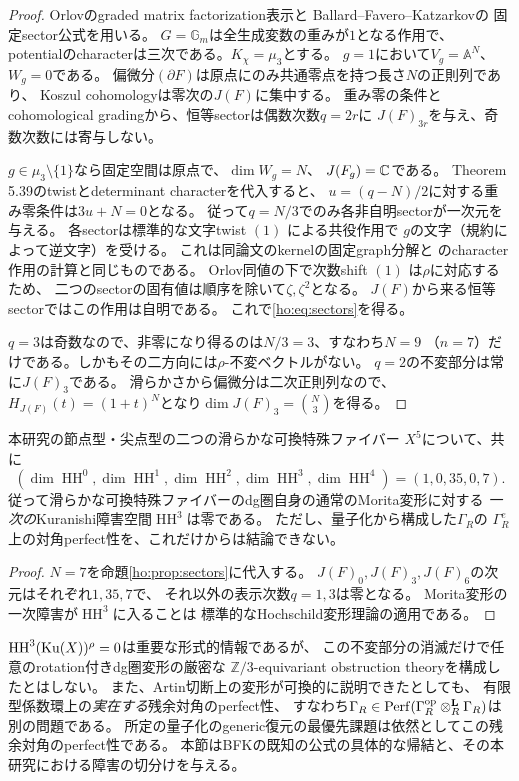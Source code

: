 \begin{proof}
Orlovのgraded matrix factorization表示と
Ballard--Favero--Katzarkov\cite[Theorem 5.39, pp.~82--85]{BFKER}の
固定sector公式を用いる。
$G=\mathbb G_m$は全生成変数の重みが$1$となる作用で、
potentialのcharacterは三次である。$K_\chi=\mu_3$とする。
$g=1$において$V_g=\mathbb A^N$、$W_g=0$である。
偏微分$(\partial F)$は原点にのみ共通零点を持つ長さ$N$の正則列であり、
Koszul cohomologyは零次の$J(F)$に集中する。
重み零の条件とcohomological gradingから、恒等sectorは偶数次数$q=2r$に
$J(F)_{3r}$を与え、奇数次数には寄与しない。

$g\in\mu_3\setminus\{1\}$なら固定空間は原点で、$\dim W_g=N$、
$J(F_g)=\mathbb C$である。
Theorem 5.39のtwistとdeterminant characterを代入すると、
$u=(q-N)/2$に対する重み零条件は$3u+N=0$となる。
従って$q=N/3$でのみ各非自明sectorが一次元を与える。
各sectorは標準的な文字twist $(1)$ による共役作用で
$g$の文字（規約によって逆文字）を受ける。
これは同論文のkernelの固定graph分解と
\cite[Theorem 6.5]{BFKER}のcharacter作用の計算と同じものである。
Orlov同値の下で次数shift $(1)$ は$\rho$に対応するため、
二つのsectorの固有値は順序を除いて$\zeta,\zeta^2$となる。
$J(F)$から来る恒等sectorではこの作用は自明である。
これで\eqref{ho:eq:sectors}を得る。

$q=3$は奇数なので、非零になり得るのは$N/3=3$、すなわち$N=9$
（$n=7$）だけである。しかもその二方向には$\rho$-不変ベクトルがない。
$q=2$の不変部分は常に$J(F)_3$である。
滑らかさから偏微分は二次正則列なので、
$H_{J(F)}(t)=(1+t)^N$となり$\dim J(F)_3=\binom N3$を得る。
\end{proof}

\begin{corollary}\label{ho:cor:fivefold}
本研究の節点型・尖点型の二つの滑らかな可換特殊ファイバー
$X^5$について、共に
\[
 (\dim\operatorname{HH}^0,\dim\operatorname{HH}^1,
 \dim\operatorname{HH}^2,\dim\operatorname{HH}^3,
 \dim\operatorname{HH}^4)=(1,0,35,0,7).
 \tag{F5}\label{ho:eq:fivefold}
\]
従って滑らかな可換特殊ファイバーのdg圏自身の通常のMorita変形に対する
\emph{一次の}Kuranishi障害空間$\operatorname{HH}^3$は零である。
ただし、量子化から構成した$\Gamma_R$の
$\Gamma_R^e$上の対角perfect性を、これだけからは結論できない。
\end{corollary}
\begin{proof}
$N=7$を命題\ref{ho:prop:sectors}に代入する。
$J(F)_0,J(F)_3,J(F)_6$の次元はそれぞれ$1,35,7$で、
それ以外の表示次数$q=1,3$は零となる。
Morita変形の一次障害が$\operatorname{HH}^3$に入ることは
標準的なHochschild変形理論の適用である。
\end{proof}

\begin{remark}[残余対角との論理的境界]\label{ho:rem:barrier}
$\operatorname{HH}^3(\operatorname{Ku}(X))^\rho=0$は重要な形式的情報であるが、
この不変部分の消滅だけで任意のrotation付きdg圏変形の厳密な
$\mathbb Z/3$-equivariant obstruction theoryを構成したとはしない。
また、Artin切断上の変形が可換的に説明できたとしても、
有限型係数環上の\emph{実在する}残余対角のperfect性、
すなわち$\Gamma_R\in\operatorname{Perf}(\Gamma_R^{\mathrm{op}}\otimes^{\mathbf L}_R\Gamma_R)$は別の問題である。
所定の量子化のgeneric復元の最優先課題は依然としてこの残余対角のperfect性である。
本節はBFKの既知の公式の具体的な帰結と、その本研究における障害の切分けを与える。
\end{remark}
